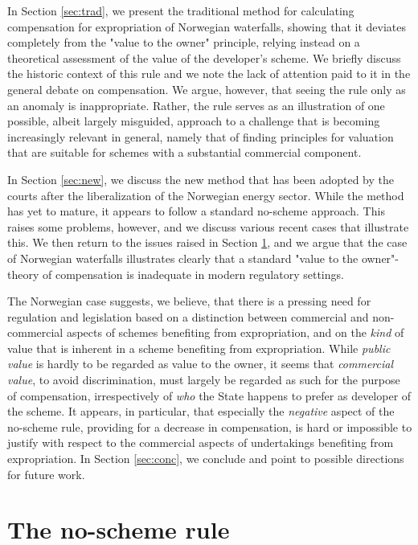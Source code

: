 In Section \ref{sec:trad}, we present the traditional method for calculating compensation for expropriation of Norwegian waterfalls, showing that it deviates completely from the "value to the owner" principle, relying instead on a theoretical assessment of the value of the developer's scheme. We briefly discuss the historic context of this rule and we note the lack of attention paid to it in the general debate on compensation. We argue, however, that seeing the rule only as an anomaly is inappropriate. Rather, the rule serves as an illustration of one possible, albeit largely misguided, approach to a challenge that is becoming increasingly relevant in general, namely that of finding principles for valuation that are suitable for schemes with a substantial commercial component. 

In Section \ref{sec:new}, we discuss the new method that has been adopted by the courts after the liberalization of the Norwegian energy sector. While the method has yet to mature, it appears to follow a standard no-scheme approach. This raises some problems, however, and we discuss various recent cases that illustrate this. We then return to the issues raised in Section \ref{sec:noscheme}, and we argue that the case of Norwegian waterfalls illustrates clearly that a standard "value to the owner"-theory of compensation is inadequate in modern regulatory settings. 

The Norwegian case suggests, we believe, that there is a pressing need for regulation and legislation based on a distinction between commercial and non-commercial aspects of schemes benefiting from expropriation, and on the \emph{kind} of value that is inherent in a scheme benefiting from expropriation. While \emph{public value} is hardly to be regarded as value to the owner, it seems that \emph{commercial value}, to avoid discrimination, must largely be regarded as such for the purpose of compensation, irrespectively of \emph{who} the State happens to prefer as developer of the scheme. It appears, in particular, that especially the \emph{negative} aspect of the no-scheme rule, providing for a decrease in compensation, is hard or impossible to justify with respect to the commercial aspects of undertakings benefiting from expropriation. In Section \ref{sec:conc}, we conclude and point to possible directions for future work.

\section{The no-scheme rule}\label{sec:noscheme}

